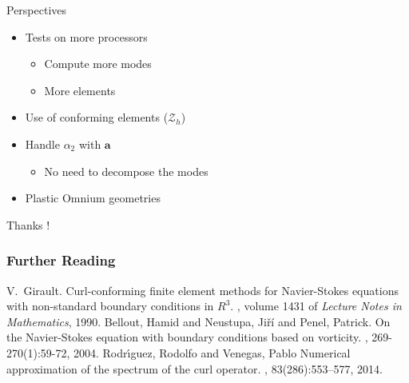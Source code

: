 \documentclass{beamer}
\newcommand{\Z}{{\bm{\mathcal{Z}}}}
\begin{document}
\begin{frame}{Perspectives}
  
  
  \begin{itemize}
  \item Tests on more processors
    \begin{itemize}
    \item Compute more modes
    \item More elements
    \end{itemize}
  \item Use of conforming elements ($\Z_h$)
  \item Handle $\alpha_2$ with $\mathbf{a}$
    \begin{itemize}
    \item No need to decompose the modes
    \end{itemize}
  \item Plastic Omnium geometries 
  \end{itemize}
\end{frame}

\begin{frame}
  \begin{center}
    Thanks !
  \end{center}
\end{frame}

\begin{frame}[allowframebreaks]
  \frametitle<presentation>{Further Reading}
  \begin{thebibliography}{10}
    \beamertemplatebookbibitems
    V.~Girault.
    \newblock Curl-conforming finite element methods for Navier-Stokes equations with non-standard boundary conditions in $R^3$.
    , volume 1431 of {\em Lecture Notes in Mathematics}, 1990.
    \beamertemplatearticlebibitems
    Bellout, Hamid and Neustupa, Jiří and Penel, Patrick.
    \newblock On the Navier-Stokes equation with boundary conditions based on vorticity.
    , 269-270(1):59-72, 2004.
    \beamertemplatearticlebibitems
    Rodr\'{\i}guez, Rodolfo and Venegas, Pablo
    \newblock Numerical approximation of the spectrum of the curl operator.
    , 83(286):553–577, 2014.
  \end{thebibliography}
\end{frame}
\end{document}
